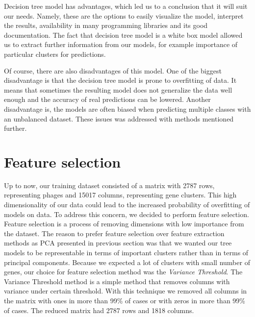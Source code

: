 Decision tree model has advantages, which led us to a conclusion that it will suit our needs.
Namely, these are the options to easily visualize the model, interpret the results, availability in many programming libraries and its good documentation.
The fact that decision tree model is a white box model allowed us to extract further information from our models, for example importance of particular clusters for predictions.

Of course, there are also disadvantages of this model.
One of the biggest disadvantage is that the decision tree model is prone to overfitting of data.
It means that sometimes the resulting model does not generalize the data well enough and the accuracy of real predictions can be lowered.
Another disadvantage is, the models are often biased when predicting multiple classes with an unbalanced dataset.
These issues was addressed with methods mentioned further.

\section{Feature selection}
Up to now, our training dataset consisted of a matrix with 2787 rows, representing phages and 15017 columns, representing gene clusters.
This high dimensionality of our data could lead to the increased probability of overfitting of models on data.
To address this concern, we decided to perform feature selection.
Feature selection is a process of removing dimensions with low importance from the dataset.
The reason to prefer feature selection over feature extraction methods as PCA presented in previous section was that we wanted our tree models to be representable in terms of important clusters rather than in terms of principal components.
Because we expected a lot of clusters with small number of genes, our choice for feature selection method was the \emph{Variance Threshold}.
The Variance Threshold method is a simple method that removes columns with variance under certain threshold.
With this technique we removed all columns in the matrix with ones in more than 99\% of cases or with zeros in more than 99\% of cases.
The reduced matrix had 2787 rows and 1818 columns.


